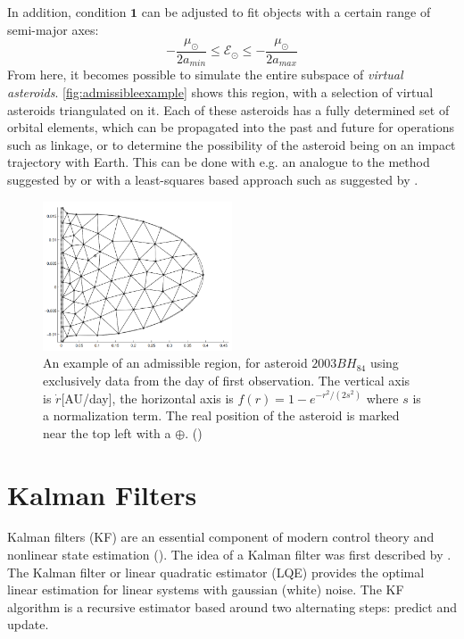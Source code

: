 In addition, condition $\mathbf{1}$ can be adjusted to fit objects with a certain range of semi-major axes:
\begin{equation}
    -\frac{\mu_\odot}{2a_{min}} \leq \mathcal{E}_\odot \leq -\frac{\mu_\odot}{2a_{max}}
\end{equation}
From here, it becomes possible to simulate the entire subspace of \textit{virtual asteroids}. \autoref{fig:admissibleexample} shows this region, with a selection of virtual asteroids triangulated on it. Each of these asteroids has a fully determined set of orbital elements, which can be propagated into the past and future for operations such as linkage, or to determine the possibility of the asteroid being on an impact trajectory with Earth. This can be done with e.g. an analogue to the method suggested by \cite{trajsix} or with a least-squares based approach such as suggested by \cite{phddissertation}.

\begin{figure}[htbp]
    \centering
    \includegraphics[width=0.5\textwidth]{images/admissibleexample.png}
    \caption{An example of an admissible region, for asteroid $2003 BH_{84}$ using exclusively data from the day of first observation. The vertical axis is $\dot{r}$[AU/day], the horizontal axis is $f(r) = 1-e^{-r^2/(2s^2)}$ where $s$ is a normalization term. The real position of the asteroid is marked near the top left with a $\oplus$. (\cite{classicmodernorbits})}
    \label{fig:admissibleexample}
\end{figure}

\section{Kalman Filters}
Kalman filters (KF) are an essential component of modern control theory and nonlinear state estimation (\cite{kalmangood}). The idea of a Kalman filter was first described by \cite{kalman}. The Kalman filter or linear quadratic estimator (LQE) provides the optimal linear estimation for linear systems with gaussian (white) noise. The KF algorithm is a recursive estimator based around two alternating steps: predict and update.\\


